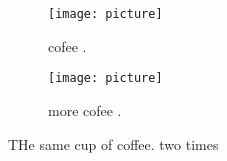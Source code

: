 \documentclass{article}
\begin{document}
	\begin{figure}[h!]\centering
		\begin{subfigure}[b]{0.4\linewidth}
			\texttt{[image: picture]}
			\caption{cofee .}
		\end{subfigure}\begin{subfigure}[b]{0.4\linewidth}
		\texttt{[image: picture]}
		\caption{more cofee .}
	\end{subfigure}\caption{THe same cup of coffee. two times}
\label{fig:coffee}
\end{figure}
\end{document}
